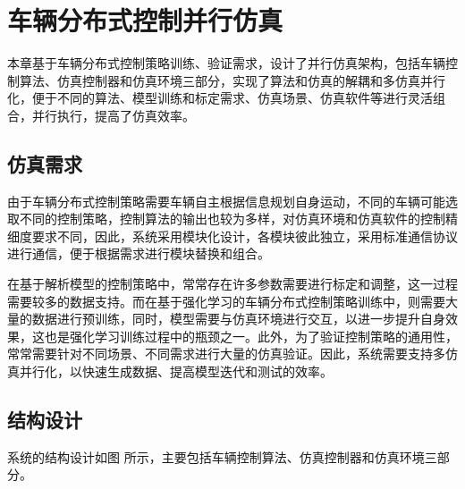 \chapter{车辆分布式控制并行仿真}
本章基于车辆分布式控制策略训练、验证需求，设计了并行仿真架构，包括车辆控制算法、仿真控制器和仿真环境三部分，实现了算法和仿真的解耦和多仿真并行化，便于不同的算法、模型训练和标定需求、仿真场景、仿真软件等进行灵活组合，并行执行，提高了仿真效率。

\section{仿真需求}

由于车辆分布式控制策略需要车辆自主根据信息规划自身运动，不同的车辆可能选取不同的控制策略，控制算法的输出也较为多样，对仿真环境和仿真软件的控制精细度要求不同，因此，系统采用模块化设计，各模块彼此独立，采用标准通信协议进行通信，便于根据需求进行模块替换和组合。

在基于解析模型的控制策略中，常常存在许多参数需要进行标定和调整，这一过程需要较多的数据支持。而在基于强化学习的车辆分布式控制策略训练中，则需要大量的数据进行预训练，同时，模型需要与仿真环境进行交互，以进一步提升自身效果，这也是强化学习训练过程中的瓶颈之一。此外，为了验证控制策略的通用性，常常需要针对不同场景、不同需求进行大量的仿真验证。因此，系统需要支持多仿真并行化，以快速生成数据、提高模型迭代和测试的效率。

\section{结构设计}

系统的结构设计如图
所示，主要包括车辆控制算法、仿真控制器和仿真环境三部分。

